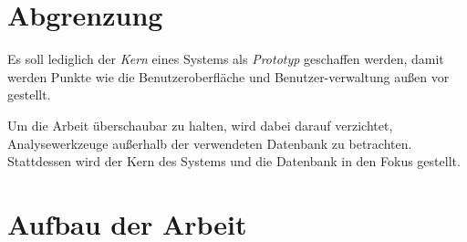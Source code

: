 \section{Abgrenzung}

Es soll lediglich der \emph{Kern} eines Systems als \emph{Prototyp} geschaffen werden,
damit werden Punkte wie die Benutzeroberfläche und Benutzer-verwaltung
außen vor gestellt.

Um die Arbeit überschaubar zu halten, wird dabei darauf verzichtet, Analysewerkzeuge außerhalb der verwendeten Datenbank zu betrachten.
Stattdessen wird der Kern des Systems und die Datenbank in den Fokus gestellt.


\section{Aufbau der Arbeit}


